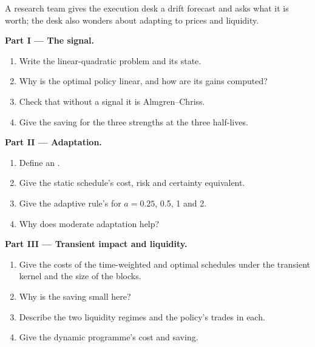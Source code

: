 \begin{problem}\label{pb:mx:beyond-almgren-chriss:1}
A research team gives the execution desk a drift forecast and asks what it is worth; the desk also wonders about adapting to prices and liquidity.

\medskip\noindent\textbf{Part I --- The signal.}
\begin{enumerate}
\item Write the linear-quadratic problem and its state.
\item Why is the optimal policy linear, and how are its gains computed?
\item Check that without a signal it is Almgren--Chriss.
\item Give the saving for the three strengths at the three half-lives.
\end{enumerate}

\medskip\noindent\textbf{Part II --- Adaptation.}
\begin{enumerate}[resume]
\item Define an .
\item Give the static schedule's cost, risk and certainty equivalent.
\item Give the adaptive rule's for $a=0.25$, 0.5, 1 and 2.
\item Why does moderate adaptation help?
\end{enumerate}

\medskip\noindent\textbf{Part III --- Transient impact and liquidity.}
\begin{enumerate}[resume]
\item Give the costs of the time-weighted and optimal schedules under the transient kernel and the size of the blocks.
\item Why is the saving small here?
\item Describe the two liquidity regimes and the policy's trades in each.
\item Give the dynamic programme's cost and saving.
\end{enumerate}


\end{problem}
